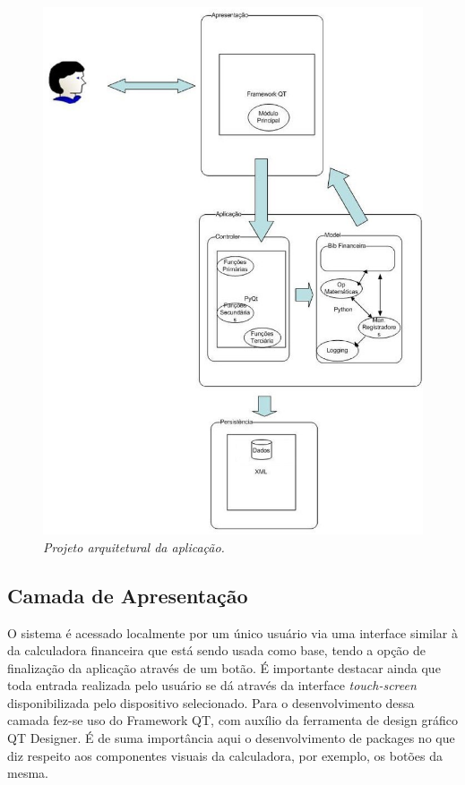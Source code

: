 \begin{figure}[!h]
 \includegraphics[scale=0.5]{arquitetura.eps}
 \caption{\it Projeto arquitetural da aplicação.} \label{fig:arquit}
\end{figure}

\subsection{Camada de Apresentação}
O sistema é acessado localmente por um único usuário via uma interface similar à da calculadora financeira que está sendo usada como base, tendo a opção de finalização da aplicação através de um botão. É importante destacar ainda que toda entrada realizada pelo usuário se dá através da interface \textit{touch-screen} disponibilizada pelo dispositivo selecionado.
Para o desenvolvimento dessa camada fez-se uso do Framework QT, com auxílio da ferramenta de design gráfico QT Designer. É de suma importância aqui o desenvolvimento de packages no que diz respeito aos componentes visuais da calculadora, por exemplo, os botões da mesma.

